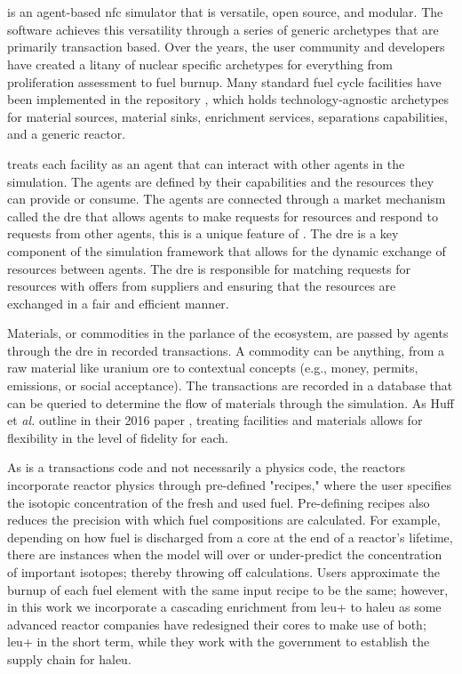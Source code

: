 \section{\cyclus}
\label{sec:cyclus}
\cyclus is an agent-based \gls{nfc} simulator that is versatile, open source, and modular. The software achieves this versatility through a series of generic archetypes that are primarily transaction based. Over the years, the user community and developers have created a litany of nuclear specific archetypes for everything from proliferation assessment to fuel burnup. Many standard fuel cycle facilities have been implemented in the \cycamore repository \cite{Carlsen_cycamore_2014}, which holds technology-agnostic archetypes for material sources, material sinks, enrichment services, separations capabilities, and a generic reactor.

\cyclus treats each facility as an agent that can interact with other agents in the simulation. The agents are defined by their capabilities and the resources they can provide or consume. The agents are connected through a market mechanism called the \gls{dre} that allows agents to make requests for resources and respond to requests from other agents, this is a unique feature of \cyclus. The \gls{dre} is a key component of the \cyclus simulation framework that allows for the dynamic exchange of resources between agents. The \gls{dre} is responsible for matching requests for resources with offers from suppliers and ensuring that the resources are exchanged in a fair and efficient manner.

Materials, or commodities in the parlance of the \cyclus ecosystem, are passed by agents through the \gls{dre} in recorded transactions. A commodity can be anything, from a raw material like uranium ore to contextual concepts (e.g., money, permits, emissions, or social acceptance). The transactions are recorded in a database that can be queried to determine the flow of materials through the simulation. As Huff et \textit{al.} outline in their 2016 paper \cite{huff_cyclus_intro_2016}, treating facilities and materials allows for flexibility in the level of fidelity for each.

As \cyclus is a transactions code and not necessarily a physics code,
the reactors incorporate reactor physics through pre-defined "recipes,"
where the user specifies the isotopic concentration of the fresh and
used fuel. Pre-defining recipes also reduces the precision with which
fuel compositions are calculated. For example, depending on how fuel is
discharged from a core at the end of a reactor's lifetime, there are
instances when the model will over or under-predict the concentration of
important isotopes; thereby throwing off calculations. Users approximate
the burnup of each fuel element with the same input recipe to be the
same; however, in this work we incorporate a cascading enrichment from
\gls{leu+} to \gls{haleu} as some advanced reactor companies have
redesigned their cores to make use of both; \gls{leu+} in the short term,
while they work with the government to establish the supply chain for
\gls{haleu}.

